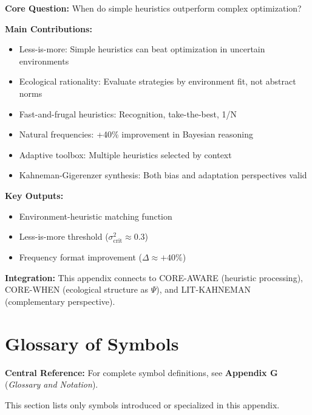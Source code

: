 \begin{tcolorbox}[colback=green!10!white, colframe=green!75!black,
    title=\textbf{Appendix UNMAPPED_GI: Summary}]

\textbf{Core Question:} When do simple heuristics outperform complex optimization?

\textbf{Main Contributions:}
\begin{itemize}[nosep]
    \item Less-is-more: Simple heuristics can beat optimization in uncertain environments
    \item Ecological rationality: Evaluate strategies by environment fit, not abstract norms
    \item Fast-and-frugal heuristics: Recognition, take-the-best, 1/N
    \item Natural frequencies: +40\% improvement in Bayesian reasoning
    \item Adaptive toolbox: Multiple heuristics selected by context
    \item Kahneman-Gigerenzer synthesis: Both bias and adaptation perspectives valid
\end{itemize}

\textbf{Key Outputs:}
\begin{itemize}[nosep]
    \item Environment-heuristic matching function
    \item Less-is-more threshold ($\sigma^2_{\text{crit}} \approx 0.3$)
    \item Frequency format improvement ($\Delta \approx +40\%$)
\end{itemize}

\textbf{Integration:} This appendix connects to CORE-AWARE (heuristic processing),
CORE-WHEN (ecological structure as $\Psi$), and LIT-KAHNEMAN (complementary perspective).

\end{tcolorbox}


\section{Glossary of Symbols}
\label{sec:gi-glossary}

\begin{tcolorbox}[colback=blue!5!white, colframe=blue!75!black]
\textbf{Central Reference:} For complete symbol definitions, see
\textbf{Appendix G} (\textit{Glossary and Notation}).

This section lists only symbols introduced or specialized in this appendix.
\end{tcolorbox}

